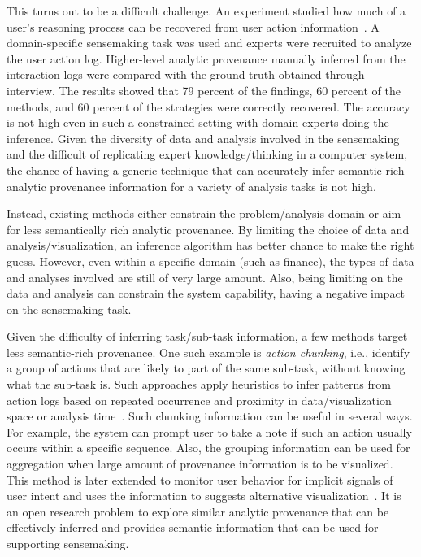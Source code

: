 This turns out to be a difficult challenge. An experiment studied how much of a user's reasoning process can be recovered from user action information~\cite{Dou2009}. A domain-specific sensemaking task was used and experts were recruited to analyze the user action log. Higher-level analytic provenance manually inferred from the interaction logs were compared with the ground truth obtained through interview. The results showed that 79 percent of the findings, 60 percent of the methods, and 60 percent of the strategies were correctly recovered. The accuracy is not high even in such a constrained setting with domain experts doing the inference. Given the diversity of data and analysis involved in the sensemaking and the difficult of replicating expert knowledge/thinking in a computer system, the chance of having a generic technique that can accurately infer semantic-rich analytic provenance information for a variety of analysis tasks is not high.

Instead, existing methods either constrain the problem/analysis domain or aim for less semantically rich analytic provenance. By limiting the choice of data and analysis/visualization, an inference algorithm has better chance to make the right guess. However, even within a specific domain (such as finance), the types of data and analyses involved are still of very large amount. Also, being limiting on the data and analysis can constrain the system capability, having a negative impact on the sensemaking task.

Given the difficulty of inferring task/sub-task information, a few methods target less semantic-rich provenance. One such example is \emph{action chunking}, i.e., identify a group of actions that are likely to part of the same sub-task, without knowing what the sub-task is. Such approaches apply heuristics to infer patterns from action logs based on repeated occurrence and proximity in data/visualization space or analysis time~\cite{Gotz2009}. Such chunking information can be useful in several ways. For example, the system can prompt user to take a note if such an action usually occurs within a specific sequence. Also, the grouping information can be used for aggregation when large amount of provenance information is to be visualized. This method is later extended to monitor user behavior for implicit signals of user intent and uses the information to suggests alternative visualization~\cite{Gotz2009}. It is an open research problem to explore similar analytic provenance that can be effectively inferred and provides semantic information that can be used for supporting sensemaking.

